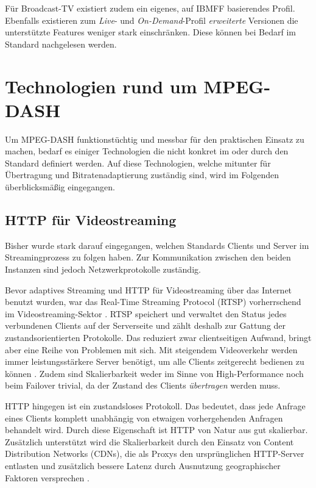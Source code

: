 \documentclass[paper = a4, fontsize = 12pt, parskip = half]{scrartcl} %
\begin{document}
Für Broadcast-TV existiert zudem ein eigenes, auf IBMFF basierendes Profil. Ebenfalls existieren zum \textit{Live}- und \textit{On-Demand}-Profil \textit{erweiterte} Versionen die unterstützte Features weniger stark einschränken. Diese können bei Bedarf im Standard nachgelesen werden.

\section{Technologien rund um MPEG-DASH}
Um MPEG-DASH funktionstüchtig und messbar für den praktischen Einsatz zu machen, bedarf es einiger Technologien die nicht konkret im oder durch den Standard definiert werden. Auf diese Technologien, welche mitunter für Übertragung und Bitratenadaptierung zuständig sind, wird im Folgenden überblicksmäßig eingegangen.

\subsection{HTTP für Videostreaming}
Bisher wurde stark darauf eingegangen, welchen Standards Clients und Server im Streamingprozess zu folgen haben. Zur Kommunikation zwischen den beiden Instanzen sind jedoch Netzwerkprotokolle zuständig.

Bevor adaptives Streaming und HTTP für Videostreaming über das Internet benutzt wurden, war das Real-Time Streaming Protocol (RTSP) vorherrschend im Videostreaming-Sektor \cite{stockhammer_dynamic_2011}. RTSP speichert und verwaltet den Status jedes verbundenen Clients auf der Serverseite und zählt deshalb zur Gattung der zustandsorientierten Protokolle. Das reduziert zwar clientseitigen Aufwand, bringt aber eine Reihe von Problemen mit sich. Mit steigendem Videoverkehr werden immer leistungsstärkere Server benötigt, um alle Clients zeitgerecht bedienen zu können \cite{stockhammer_dynamic_2011}. Zudem sind Skalierbarkeit weder im Sinne von High-Performance noch beim Failover trivial, da der Zustand des Clients \textit{übertragen} werden muss.

HTTP hingegen ist ein zustandsloses Protokoll. Das bedeutet, dass jede Anfrage eines Clients komplett unabhängig von etwaigen vorhergehenden Anfragen behandelt wird. Durch diese Eigenschaft ist HTTP von Natur aus gut skalierbar. Zusätzlich unterstützt wird die Skalierbarkeit durch den Einsatz von Content Distribution Networks (CDNs), die als Proxys den ursprünglichen HTTP-Server entlasten und zusätzlich bessere Latenz durch Ausnutzung geographischer Faktoren versprechen \cite{buyya_content_2008}.
\end{document}
